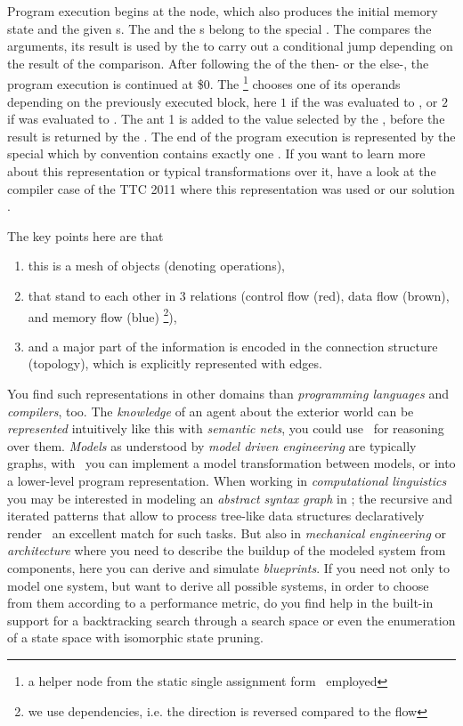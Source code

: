 Program execution begins at the  node, which also produces the initial memory state and the given s.
The  and the s belong to the special .
The  compares the arguments, its result is used by the  to carry out a conditional jump depending on the result of the comparison.
After following the  of the then- or the else-, the program execution is continued at  \$0.
The \footnote{a helper node from the static single assignment form~\cite{ssa} employed} 
chooses one of its operands depending on the previously executed block,
here  $1$ if the  was evaluated to ,
or  $2$ if  was evaluated to .
The ant 1 is added to the value selected by the ,
before the result is returned by the .
The end of the program execution is represented by the special  which by convention contains exactly one .
If you want to learn more about this representation or typical transformations over it, have a look at the compiler case\cite{CompilerCase} of the TTC 2011 where this representation was used or our solution \cite{CompilerOptimization}.

The key points here are that
\begin{enumerate}
	\item this is a mesh of objects (denoting operations),
	\item that stand to each other in 3 relations (control flow (red), data flow (brown), and memory flow (blue) \footnote{we use dependencies, i.e. the direction is reversed compared to the flow}), 
	\item and a major part of the information is encoded in the connection structure (topology),
	which is explicitly represented with edges.
\end{enumerate}

You find such representations in other domains than \emph{programming languages} and \emph{compilers}, too.
The \emph{knowledge} of an agent about the exterior world can be \emph{represented} intuitively like this with \emph{semantic nets}, you could use \GrG\ for reasoning over them.
\emph{Models} as understood by \emph{model driven engineering} are typically graphs, with \GrG\ you can implement a model transformation between models, or into a lower-level program representation.
When working in \emph{computational linguistics} you may be interested in modeling an \emph{abstract syntax graph} in \GrG;
the recursive and iterated patterns that allow to process tree-like data structures declaratively render \GrG\ an excellent match for such tasks.
But also in \emph{mechanical engineering} or \emph{architecture} where you need to describe the buildup of the modeled system from components, here you can derive and simulate \emph{blueprints}.
If you need not only to model one system, but want to derive all possible systems, in order to choose from them according to a performance metric, do you find help in the built-in support for a backtracking search through a search space or even the enumeration of a state space with isomorphic state pruning.



